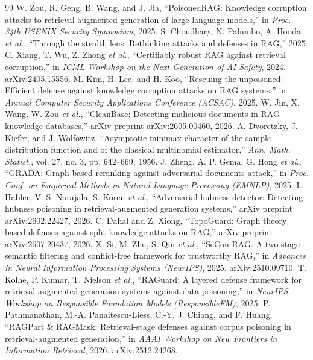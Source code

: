 \documentclass[10pt,journal,compsoc]{IEEEtran}
\begin{document}

\begin{thebibliography}{99}
 W. Zou, R. Geng, B. Wang, and J. Jia, ``PoisonedRAG: Knowledge corruption attacks to retrieval-augmented generation of large language models,'' in \emph{Proc. 34th USENIX Security Symposium}, 2025.
 S. Choudhary, N. Palumbo, A. Hooda \emph{et al.}, ``Through the stealth lens: Rethinking attacks and defenses in RAG,'' 2025.
 C. Xiang, T. Wu, Z. Zhong \emph{et al.}, ``Certifiably robust RAG against retrieval corruption,'' in \emph{ICML Workshop on the Next Generation of AI Safety}, 2024. arXiv:2405.15556.
 M. Kim, H. Lee, and H. Koo, ``Rescuing the unpoisoned: Efficient defense against knowledge corruption attacks on RAG systems,'' in \emph{Annual Computer Security Applications Conference (ACSAC)}, 2025.
 W. Jin, X. Wang, W. Zou \emph{et al.}, ``CleanBase: Detecting malicious documents in RAG knowledge databases,'' arXiv preprint arXiv:2605.00460, 2026.
 A. Dvoretzky, J. Kiefer, and J. Wolfowitz, ``Asymptotic minimax character of the sample distribution function and of the classical multinomial estimator,'' \emph{Ann. Math. Statist.}, vol. 27, no. 3, pp. 642--669, 1956.
 J. Zheng, A. P. Gema, G. Hong \emph{et al.}, ``GRADA: Graph-based reranking against adversarial documents attack,'' in \emph{Proc. Conf. on Empirical Methods in Natural Language Processing (EMNLP)}, 2025.
 I. Habler, V. S. Narajala, S. Koren \emph{et al.}, ``Adversarial hubness detector: Detecting hubness poisoning in retrieval-augmented generation systems,'' arXiv preprint arXiv:2602.22427, 2026.
 C. Dahal and Z. Xiong, ``TopoGuard: Graph theory based defenses against split-knowledge attacks on RAG,'' arXiv preprint arXiv:2607.20437, 2026.
 X. Si, M. Zhu, S. Qin \emph{et al.}, ``SeCon-RAG: A two-stage semantic filtering and conflict-free framework for trustworthy RAG,'' in \emph{Advances in Neural Information Processing Systems (NeurIPS)}, 2025. arXiv:2510.09710.
 T. Kolhe, P. Kumar, T. Nielson \emph{et al.}, ``RAGuard: A layered defense framework for retrieval-augmented generation systems against data poisoning,'' in \emph{NeurIPS Workshop on Responsible Foundation Models (ResponsibleFM)}, 2025.
 P. Pathmanathan, M.-A. Panaitescu-Liess, C.-Y. J. Chiang, and F. Huang, ``RAGPart \& RAGMask: Retrieval-stage defenses against corpus poisoning in retrieval-augmented generation,'' in \emph{AAAI Workshop on New Frontiers in Information Retrieval}, 2026. arXiv:2512.24268.

\end{thebibliography}
\end{document}

